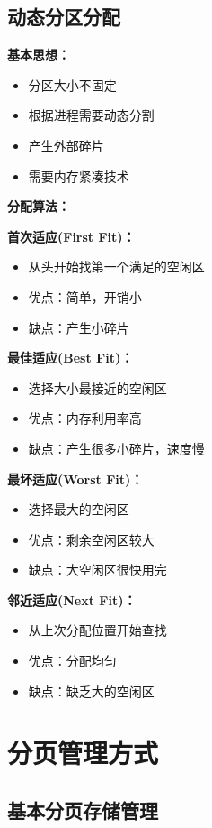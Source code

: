 \documentclass[lang=cn,newtx,10pt,scheme=chinese]{../../elegantbook}
\begin{document}
\subsection{动态分区分配}

\textbf{基本思想：}
\begin{itemize}
  \item 分区大小不固定
  \item 根据进程需要动态分割
  \item 产生外部碎片
  \item 需要内存紧凑技术
\end{itemize}

\textbf{分配算法：}

\textbf{首次适应(First Fit)：}
\begin{itemize}
  \item 从头开始找第一个满足的空闲区
  \item 优点：简单，开销小
  \item 缺点：产生小碎片
\end{itemize}

\textbf{最佳适应(Best Fit)：}
\begin{itemize}
  \item 选择大小最接近的空闲区
  \item 优点：内存利用率高
  \item 缺点：产生很多小碎片，速度慢
\end{itemize}

\textbf{最坏适应(Worst Fit)：}
\begin{itemize}
  \item 选择最大的空闲区
  \item 优点：剩余空闲区较大
  \item 缺点：大空闲区很快用完
\end{itemize}

\textbf{邻近适应(Next Fit)：}
\begin{itemize}
  \item 从上次分配位置开始查找
  \item 优点：分配均匀
  \item 缺点：缺乏大的空闲区
\end{itemize}

\section{分页管理方式}

\subsection{基本分页存储管理}
\end{document}
